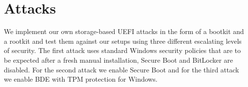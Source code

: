 
\chapter{Attacks}
\label{sec:attacks}

We implement our own storage-based \ac{UEFI} attacks in the form of a bootkit and a rootkit and test them against our setups using three different escalating levels of security.
The first attack uses standard Windows security policies that are to be expected after a fresh manual installation, Secure Boot and BitLocker are disabled.
For the second attack we enable Secure Boot and for the third attack we enable \ac{BDE} with \ac{TPM} protection for Windows.



